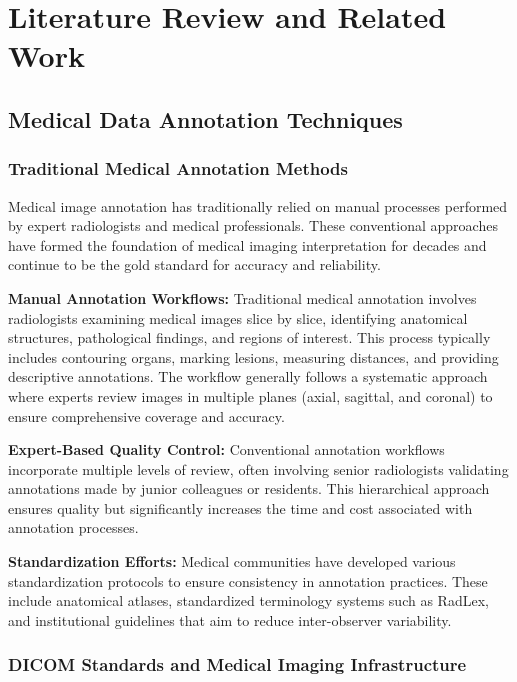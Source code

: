 \chapter{Literature Review and Related Work}

\section{Medical Data Annotation Techniques}

\subsection{Traditional Medical Annotation Methods}

Medical image annotation has traditionally relied on manual processes performed by expert radiologists and medical professionals. These conventional approaches have formed the foundation of medical imaging interpretation for decades and continue to be the gold standard for accuracy and reliability.

\textbf{Manual Annotation Workflows:} Traditional medical annotation involves radiologists examining medical images slice by slice, identifying anatomical structures, pathological findings, and regions of interest. This process typically includes contouring organs, marking lesions, measuring distances, and providing descriptive annotations. The workflow generally follows a systematic approach where experts review images in multiple planes (axial, sagittal, and coronal) to ensure comprehensive coverage and accuracy.

\textbf{Expert-Based Quality Control:} Conventional annotation workflows incorporate multiple levels of review, often involving senior radiologists validating annotations made by junior colleagues or residents. This hierarchical approach ensures quality but significantly increases the time and cost associated with annotation processes.

\textbf{Standardization Efforts:} Medical communities have developed various standardization protocols to ensure consistency in annotation practices. These include anatomical atlases, standardized terminology systems such as RadLex, and institutional guidelines that aim to reduce inter-observer variability.

\subsection{DICOM Standards and Medical Imaging Infrastructure}

